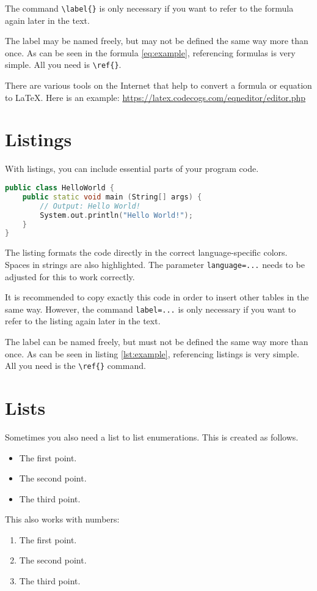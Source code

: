The command \texttt{\textbackslash{}label\{\}} is only necessary if you want to refer to the formula again later in the text.

The label may be named freely, but may not be defined the same way more than once. As can be seen in the formula \ref{eq:example}, referencing formulas is very simple. All you need is \texttt{\textbackslash{}ref\{\}}.

There are various tools on the Internet that help to convert a formula or equation to LaTeX. Here is an example: \href{https://latex.codecogs.com/eqneditor/editor.php}{https://latex.codecogs.com/eqneditor/editor.php}


\section{Listings}
With listings, you can include essential parts of your program code.

\begin{lstlisting}[caption=My listing example, label=lst:example, language=C++]
public class HelloWorld {
	public static void main (String[] args) {
		// Output: Hello World!
		System.out.println("Hello World!");
	}
}
\end{lstlisting}

The listing formats the code directly in the correct language-specific colors. Spaces in strings are also highlighted. The parameter \texttt{language=...} needs to be adjusted for this to work correctly.

It is recommended to copy exactly this code in order to insert other tables in the same way. However, the command \texttt{label=...} is only necessary if you want to refer to the listing again later in the text.

The label can be named freely, but must not be defined the same way more than once. As can be seen in listing \ref{lst:example}, referencing listings is very simple. All you need is the \texttt{\textbackslash{}ref\{\}} command.


\section{Lists}
Sometimes you also need a list to list enumerations. This is created as follows.

\begin{itemize}
\item The first point.
\item The second point.
\item The third point.
\end{itemize}

This also works with numbers:

\begin{enumerate}
\item The first point.
\item The second point.
\item The third point.
\end{enumerate}